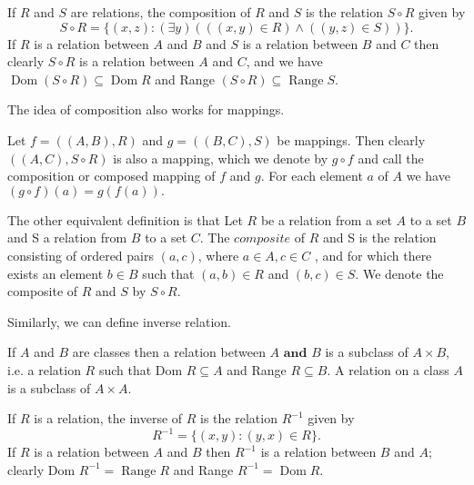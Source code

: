 	
    \begin{definition}
        If $R$ and $S$ are relations, the composition of $R$ and $S$ is the relation $S\circ R$ given by
        $$
        S\circ R=\{(x,z):(\exists y)(((x,y)\in R)\wedge((y,z)\in S))\}.
        $$
        If $R$ is a relation between $A$ and $B$ and $S$ is a relation between $B$ and $C$ then clearly 
        $S\circ R$ is a relation between $A$ and $C$, and we have $\operatorname{Dom}\left(S\circ R\right)\subseteq\operatorname{Dom}R$ and Range $(S\circ R)\subseteq\operatorname{Range}S.$
    \end{definition}
    The idea of composition also works for mappings.
\begin{definition}
    Let $f= ( ( A, B) , R) $ and $g= ( ( B, C) , S) $ be mappings. Then clearly 
    $((A,C),S\circ R)$ is also a mapping, which we denote by $g\circ f$ and call the composition or 
    composed mapping of $f$ and $g$. For each element $a$ of $A$ we have $( g\circ f) ( a) = g( f( a) ).$

\end{definition}
\begin{remark}
	The other equivalent definition is that
	Let $R$ be a relation from a set $A$ to a set $B$ and S a relation from $B$ to a set $C$. The $composite$ of $R$ and S is the relation consisting of ordered pairs $(a,c)$, where $a\in A, c\in C$ , and for which there exists an element $b\in B$ such that $( a, b) \in R$ and $( b, c) \in S.$ We denote the composite of $R$ and $S$ by $S\circ R.$
\end{remark}
    Similarly, we can define inverse relation.
    \begin{definition}
        If $A$ and $B$ are classes then a relation between $A\textbf{ and }B$ is a subclass of $A\times B$, 
        i.e. a relation $R$ such that Dom $R\subseteq A$ and Range $R\subseteq B.$ A relation on a class $A$ 
        is a subclass of $A\times A.$

        If $R$ is a relation, the inverse of $R$ is the relation $R^{-1}$ given by
        $$
        R^{-1}=\{(x,y):(y,x)\in R\}.
        $$
        If $R$ is a relation between $A$ and $B$ then $R^{-1}$ is a relation between $B$ and $A;$ 
        clearly Dom $R^{-1}=\operatorname{Range}R$ and Range $R^{-1}=\operatorname{Dom}R.$
    \end{definition}

